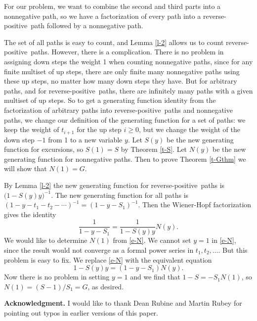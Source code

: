 \documentclass[12pt,reqno, oneside]{amsart}
\newcommand{\rp}{reverse-positive}
\begin{document}
For our problem, we want to combine the second and third parts into a nonnegative path, so we have a factorization of every path into a \rp\ path followed by a nonnegative path. 

The set of all paths is easy to count, and Lemma \ref{l-2} allows us to count \rp\ paths. However, there is a complication. 
There is no problem in assigning down steps the weight 1 when counting nonnegative paths, since for any finite multiset of up steps, there are only finite many nonnegative paths using these up steps, no matter how many down steps they have. But for arbitrary paths, and for \rp\ paths, there are infinitely many paths with a given multiset of up steps. So to get a generating function identity from the factorization of arbitrary paths into \rp\ paths and nonnegative paths, we change our definition of the generating function for a set of paths: we keep the weight of $t_{i+1}$ for the up step $i\ge0$, but we change the weight of the down step $-1$  from 1 to a new variable $y$. Let $S(y)$ be the new generating function for excursions, so $S(1) = S$ by Theorem \ref{t-S}. Let $N(y)$ be the new generating function for nonnegative paths. Then to prove Theorem \ref{t-Gthm} we will show that $N(1) = G$.

By Lemma \ref{l-2} the new generating function for \rp\ paths is $\bigl(1-S(y)y\bigr)^{-1}$. The new generating function for all paths is $(1-y-t_1-t_2-\cdots)^{-1}=(1-y-S_1)^{-1}$. Then the Wiener-Hopf factorization  gives the identity
\begin{equation}
\label{e-N}
\frac{1}{1-y-S_1}=\frac{1}{1-S(y)y}N(y).
\end{equation}
We would like to determine $N(1)$ from \eqref{e-N}. We cannot set $y=1$ in \eqref{e-N}, since the result would not converge as a formal power series in $t_1, t_2,\dots$. 
But this problem is easy to fix. We replace \eqref{e-N} with the equivalent equation
\begin{equation*}
1-S(y)y = (1-y-S_1)N(y).
\end{equation*}
Now there is no problem in setting $y=1$ and we find that $1-S =-S_1 N(1)$, so $N(1)= (S-1)/S_1=G$, as desired.

\bigskip
\textbf{Acknowledgment.} I would like to thank Dean Rubine and Martin Rubey for pointing out typos in earlier versions of this paper.


{}

\end{document}

